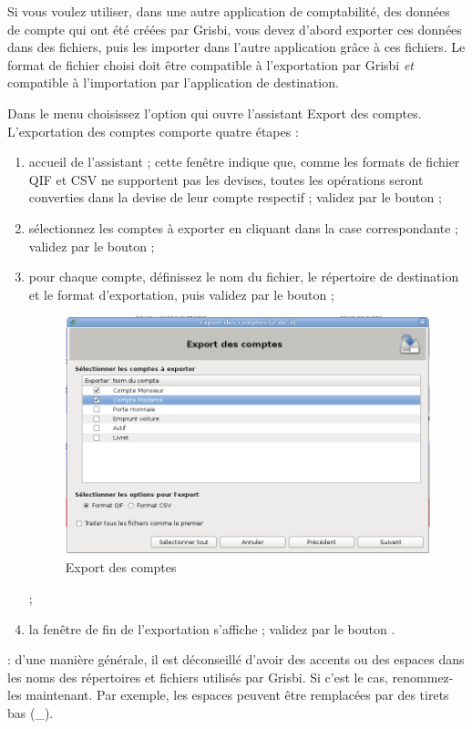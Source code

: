 Si vous voulez utiliser, dans une autre application de comptabilité, des données de compte qui ont été créées par Grisbi, vous devez d'abord exporter ces données dans des fichiers, puis les importer dans l'autre application grâce à ces fichiers. Le format de fichier choisi doit être compatible à l'exportation par Grisbi \emph{et} compatible à l'importation par l'application de destination.
 
Dans le menu  choisissez l'option  qui ouvre l'assistant Export des comptes. L'exportation des comptes comporte quatre étapes :

\begin{enumerate}
	\item accueil de l'assistant ; cette fenêtre indique que, comme les formats de fichier QIF et CSV ne supportent pas les devises, toutes les opérations seront converties dans la devise de leur compte respectif ; validez par le bouton  ;
	\item sélectionnez les comptes à exporter en cliquant dans la case correspondante ; validez par le bouton  ;
	\item pour chaque compte, définissez le nom du fichier, le répertoire de destination et le format d'exportation, puis validez par le bouton  \ifIllustration {} ;
	\begin{figure}[t]
	\begin{center}
	\includegraphics[scale=0.5]{image/screenshot/QIF_export}
	\end{center}
	\caption{Export des comptes}
	\label{QIF-export-img}
	\end{figure}
	\else  ;
	\fi
	
	\item la fenêtre de fin de l'exportation s'affiche ; validez par le bouton .
\end{enumerate}

 : d'une manière générale, il est déconseillé d'avoir des accents ou des espaces dans les noms des répertoires et fichiers utilisés par Grisbi. Si c'est le cas, renommez-les maintenant. Par exemple, les espaces peuvent être remplacées par des tirets bas (\_).











